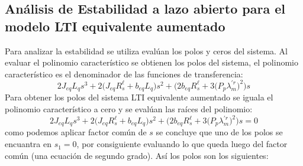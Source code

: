 \documentclass[blue,fullpaper]{ludusofficial}  %
\begin{document}
\subsection{Análisis de Estabilidad a lazo abierto para el modelo LTI equivalente aumentado}
Para analizar la estabilidad se utiliza evalúan los polos y ceros del sistema. Al evaluar el polinomio característico se obtienen los polos del sistema, el polinomio característico es el denominador de las funciones de transferencia:
\begin{equation}
    2J_{eq}L_qs^3+2\Big(J_{eq}R_s^\ell+b_{eq}L_q\Big)s^2+\Big(2b_{eq}R_s^\ell+3\Big(P_p\lambda^{'r}_m\Big)^2\Big)s
\end{equation}
Para obtener los polos del sistema LTI equivalente aumentado se iguala el polinomio característico a cero y se evalúan las raíces del polinomio:
\begin{equation}
    2J_{eq}L_qs^3+2\Big(J_{eq}R_s^\ell+b_{eq}L_q\Big)s^2+\Big(2b_{eq}R_s^\ell+3\Big(P_p\lambda^{'r}_m\Big)^2\Big)s=0
\end{equation}
como podemos aplicar factor común de $s$ se concluye que uno de los polos se encuantra en $s_1=0$, por consiguiente evaluando lo que queda luego del factor común (una ecuación de segundo grado). Así los polos son los siguientes: 
\end{document}
